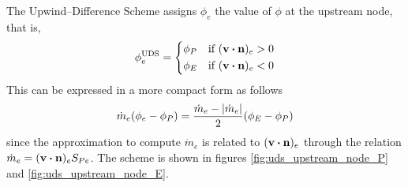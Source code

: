 The Upwind--Difference Scheme assigns $\phi_e$ the value of $\phi$ at the upstream node, that is,
\begin{equation}
	\phi_e^\text{UDS} = 
	\left\{
	\begin{aligned}
		&\phi_P & &\text{if } (\vb{v} \vdot \vb{n})_e > 0 \\
		&\phi_E & &\text{if } (\vb{v} \vdot \vb{n})_e < 0 \\
	\end{aligned}
	\right.
\end{equation}
This can be expressed in a more compact form as follows
\begin{equation}
	\dot{m}_e ( \phi_e - \phi_P ) = 
	\frac{\dot{m}_e - \abs{\dot{m}_e}}{2} ( \phi_E - \phi_P )
\end{equation}
since the approximation to compute $\dot{m}_e$ is related to $(\vb{v} \vdot \vb{n})_e$ through the relation $\dot{m}_e = (\vb{v} \vdot \vb{n})_e S_{Pe}$. The scheme is shown in figures \ref{fig:uds_upstream_node_P} and \ref{fig:uds_upstream_node_E}.

